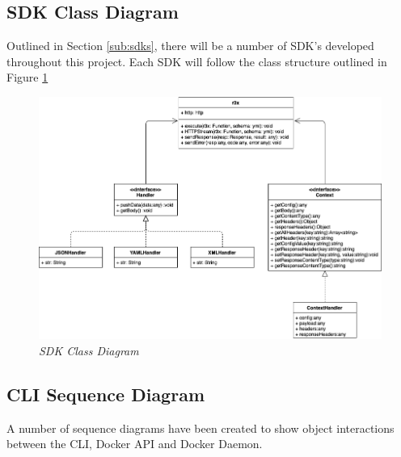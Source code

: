 \subsection{SDK Class Diagram}
\label{sub:classdia}
Outlined in Section \ref{sub:sdks}, there will be a number of \gls{SDK}'s developed throughout this project. Each SDK will follow the class structure outlined in Figure \ref{img:sdk-class}
\begin{figure}[!hb]
\centering
\includegraphics*[width=1\textwidth]{images/sdk-class-dia.png}
\caption{\em SDK Class Diagram}
\label{img:sdk-class}
\end{figure}

\newpage
\subsection{CLI Sequence Diagram}
\label{sub:sequence}
A number of sequence diagrams have been created to show object interactions between the \gls{CLI}, \gls{Docker} \gls{API} and \gls{Docker} Daemon.

